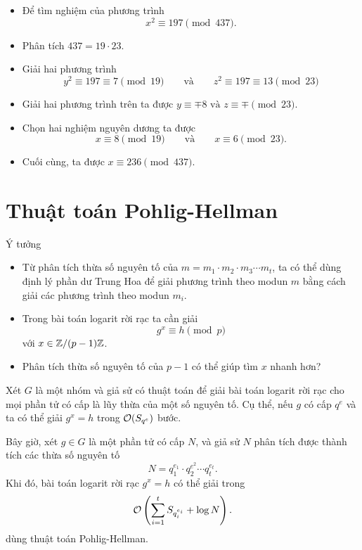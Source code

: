 \begin{frame}
	\begin{xmpl}
		\begin{itemize}
			\item Để  tìm nghiệm của phương trình 
			\[
				x^2 \equiv 197 \pmod{437}.
				\]
			\item Phân tích $437 = 19 \cdot 23$.
			\item<+-> Giải hai phương trình 
			\[
				y^2 \equiv 197 \equiv 7 \pmod{19}\qquad \text{và}\qquad z^2 \equiv 197 \equiv 13 \pmod{23}  
			\] 
			\item<+-> Giải hai phương trình trên ta được $y \equiv \mp 8 \text{ và } z \equiv \mp \pmod{23}.$			 
			\item<+-> Chọn hai nghiệm nguyên dương ta được 
			\[
				x \equiv 8 \pmod{19} \qquad \text{và} \qquad x \equiv 6 \pmod{23}.
			\] 
			\item<+-> Cuối cùng, ta được $x \equiv 236 \pmod{437}$. 
		\end{itemize}
	\end{xmpl}
\end{frame}

\section{Thuật toán Pohlig-Hellman}
\begin{frame}{Ý  tưởng}
	\begin{itemize}
		\item<+-> Từ phân tích thừa số  nguyên tố của $m = m_1 \cdot m_2 \cdot m_3 \cdots m_t$, ta có thể dùng định lý phần dư Trung Hoa để giải phương trình theo modun $m$ bằng cách giải các phương trình theo modun $m_i$. 
		\item<+-> Trong bài toán logarit rời rạc ta cần giải
		\[
			g^x \equiv h \pmod{p}
		\] 
		với $x \in \mathbb{Z}/(p-1)\mathbb{Z}$.
		\item<+-> Phân tích thừa số nguyên tố của $p-1$ có thể giúp tìm $x$ nhanh hơn? 
	\end{itemize}
\end{frame}

\begin{frame}
	\begin{thrm}
		Xét $G$ là một nhóm và giả sử có thuật toán để giải bài toán logarit rời rạc cho mọi phần tử có cấp là lũy thừa của một số nguyên tố. Cụ thể, nếu $g$ có cấp $q^e$ và ta có thể giải $g^x = h$ trong $\mathcal{O}(S_{q^e})$ bước.
		\vspace{0.2cm}
		
		Bây giờ, xét $g \in G$ là một phần tử có cấp $N$, và giả sử $N$ phân tích được thành tích các thừa số nguyên tố 
		\[
			N = q_1^{e_1} \cdot q_2^{e^2}\cdots q_t^{e_t}.
		\] 
		Khi đó, bài toán logarit rời rạc $g^x = h$ có thể giải trong 
		\[
			\mathcal{O}\left(\sum_{i=1}^t S_{q_i^{e_i}} + \log N \right).
		\]
		dùng thuật toán Pohlig-Hellman.
	\end{thrm}
\end{frame}


